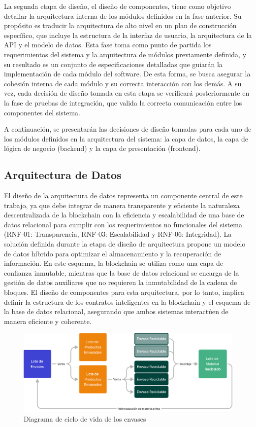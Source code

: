 La segunda etapa de diseño, el diseño de componentes, tiene como objetivo detallar la arquitectura interna de los módulos definidos en la fase anterior. Su propósito es traducir la arquitectura de alto nivel en un plan de construcción específico, que incluye la estructura de la interfaz de usuario, la arquitectura de la API y el modelo de datos. Esta fase toma como punto de partida los requerimientos del sistema y la arquitectura de módulos previamente definida, y su resultado es un conjunto de especificaciones detalladas que guiarán la implementación de cada módulo del software. De esta forma, se busca asegurar la cohesión interna de cada módulo y su correcta interacción con los demás. A su vez, cada decisión de diseño tomada en esta etapa se verificará posteriormente en la fase de pruebas de integración, que valida la correcta comunicación entre los componentes del sistema.

A continuación, se presentarán las decisiones de diseño tomadas para cada uno de los módulos definidos en la arquitectura del sistema: la capa de datos, la capa de lógica de negocio (backend) y la capa de presentación (frontend).

\subsection{Arquitectura de Datos}

El diseño de la arquitectura de datos representa un componente central de este trabajo, ya que debe integrar de manera transparente y eficiente la naturaleza descentralizada de la blockchain con la eficiencia y escalabilidad de una base de datos relacional para cumplir con los requerimientos no funcionales del sistema (RNF-01: Transparencia, RNF-03: Escalabilidad y RNF-06: Integridad). La solución definida durante la etapa de diseño de arquitectura propone un modelo de datos híbrido para optimizar el almacenamiento y la recuperación de información. En este esquema, la blockchain se utiliza como una capa de confianza inmutable, mientras que la base de datos relacional se encarga de la gestión de datos auxiliares que no requieren la inmutabilidad de la cadena de bloques. El diseño de componentes para esta arquitectura, por lo tanto, implica definir la estructura de los contratos inteligentes en la blockchain y el esquema de la base de datos relacional, asegurando que ambos sistemas interactúen de manera eficiente y coherente.

\begin{figure}[!b]
    \centering
    \includegraphics[width=\linewidth]{Figures/data-lifecycle.png}
    \caption{Diagrama de ciclo de vida de los envases}
    \label{fig:data-lifecycle}
\end{figure}

